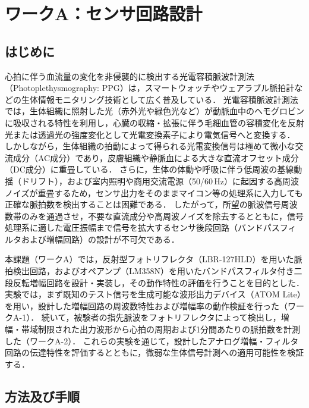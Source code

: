 \chapter{ワークA：センサ回路設計}

\section{はじめに}

心拍に伴う血流量の変化を非侵襲的に検出する光電容積脈波計測法（Photoplethysmography: PPG）は，スマートウォッチやウェアラブル脈拍計などの生体情報モニタリング技術として広く普及している\cite{elgendi2019use, hertzman1938blood}．
光電容積脈波計測法では，生体組織に照射した光（赤外光や緑色光など）が動脈血中のヘモグロビンに吸収される特性を利用し，心臓の収縮・拡張に伴う毛細血管の容積変化を反射光または透過光の強度変化として光電変換素子により電気信号へと変換する．
しかしながら，生体組織の拍動によって得られる光電変換信号は極めて微小な交流成分（AC成分）であり，皮膚組織や静脈血による大きな直流オフセット成分（DC成分）に重畳している．
さらに，生体の体動や呼吸に伴う低周波の基線動揺（ドリフト），および室内照明や商用交流電源（50/60\,Hz）に起因する高周波ノイズが重畳するため，センサ出力をそのままマイコン等の処理系に入力しても正確な脈拍数を検出することは困難である．
したがって，所望の脈波信号周波数帯のみを通過させ，不要な直流成分や高周波ノイズを除去するとともに，信号処理系に適した電圧振幅まで信号を拡大するセンサ後段回路（バンドパスフィルタおよび増幅回路）の設計が不可欠である．

本課題（ワークA）では，反射型フォトリフレクタ（LBR-127HLD）を用いた脈拍検出回路，およびオペアンプ（LM358N）を用いたバンドパスフィルタ付き二段反転増幅回路を設計・実装し，その動作特性の評価を行うことを目的とした．
実験では，まず既知のテスト信号を生成可能な波形出力デバイス（ATOM Lite）を用い，設計した増幅回路の周波数特性および増幅率の動作検証を行った（ワークA-1）．
続いて，被験者の指先脈波をフォトリフレクタによって検出し，増幅・帯域制限された出力波形から心拍の周期および1分間あたりの脈拍数を計測した（ワークA-2）．
これらの実験を通じて，設計したアナログ増幅・フィルタ回路の伝達特性を評価するとともに，微弱な生体信号計測への適用可能性を検証する．


\section{方法及び手順}

